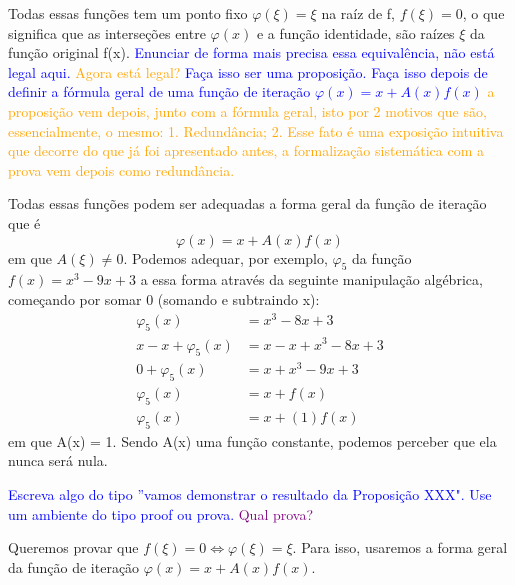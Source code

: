 Todas essas funções tem um ponto fixo $\varphi(\xi) = \xi$ na raíz de f, $f(\xi) = 0$, o que significa que as interseções entre $\varphi(x)$ e a função identidade, são raízes $\xi$ da função original f(x). \textcolor{blue}{Enunciar de forma mais precisa essa equivalência, não está legal aqui.} \textcolor{orange}{Agora está legal?} \textcolor{blue}{Faça isso ser uma proposição. Faça isso depois de definir a fórmula geral de uma função de iteração $\varphi(x) = x + A(x)f(x)$} \textcolor{orange}{a proposição vem depois, junto com a fórmula geral, isto por 2 motivos que são, essencialmente, o mesmo: 1. Redundância; 2. Esse fato é uma exposição intuitiva que decorre do que já foi apresentado antes, a formalização sistemática com a prova vem depois como redundância.}

Todas essas funções podem ser adequadas a forma geral da função de iteração que é 
\begin{equation}
    \varphi(x) = x + A(x)f(x) \label{it}
\end{equation}
em que $A(\xi) \ne 0$. Podemos adequar, por exemplo, $\varphi_5$ da função $f(x) = x^3 -9x + 3$ a essa forma através da seguinte manipulação algébrica, começando por somar 0 (somando e subtraindo x):
\begin{align*}
    \varphi_5(x) &= x^3 - 8x + 3 \\
    x - x + \varphi_5(x) &= x - x + x^3 - 8x + 3 \\
    0 + \varphi_5(x) &= x + x^3 - 9x + 3\\
    \varphi_5(x) &= x + f(x)\\
    \varphi_5(x) &= x + (1)f(x)
\end{align*}
em que A(x) = 1. Sendo A(x) uma função constante, podemos perceber que ela nunca será nula.

\textcolor{blue}{Escreva algo do tipo ''vamos demonstrar o resultado da Proposição XXX". Use um ambiente do tipo proof ou prova.} \textcolor{purple}{Qual prova?} 

\newpage

Queremos provar que $f(\xi) = 0 \iff \varphi(\xi) = \xi$. Para isso, usaremos a forma geral da função de iteração $\varphi(x) = x + A(x)f(x)$.



